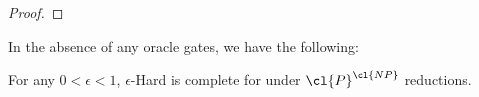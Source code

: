 \begin{proof}
\end{proof}

In the absence of any oracle gates, we have the following:
\begin{theorem}\label{thm:apepp-completeness}
For any $0 < \epsilon < 1$, {\sc $\epsilon$-Hard} is complete for  under $\cl{P}^\cl{NP}$ reductions.
\end{theorem}

